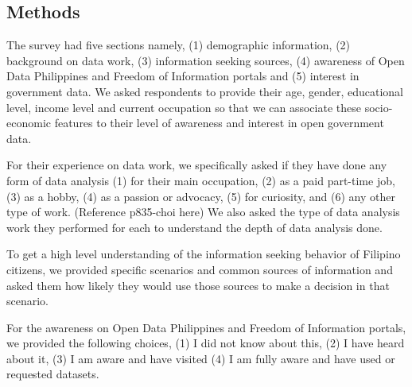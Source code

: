 \documentclass{sigchi}
\begin{document}

\subsection{Methods}
The survey had five sections namely, (1) demographic information, (2) background on data work, (3) information seeking sources, (4) awareness of Open Data Philippines and Freedom of Information portals and (5) interest in government data. We asked respondents to provide their age, gender, educational level, income level and current occupation so that we can associate these socio-economic features to their level of awareness and interest in open government data.

For their experience on data work, we specifically asked if they have done any form of data analysis (1) for their main occupation, (2) as a paid part-time job, (3) as a hobby, (4) as a passion or advocacy, (5) for curiosity, and (6) any other type of work. (Reference p835-choi here) We also asked the type of data analysis work they performed for each to understand the depth of data analysis done.

To get a high level understanding of the information seeking behavior of Filipino citizens, we provided specific scenarios and common sources of information and asked them how likely they would use those sources to make a decision in that scenario. 

For the awareness on Open Data Philippines and Freedom of Information portals, we provided the following choices, (1) I did not know about this, (2) I have heard about it, (3) I am aware and have visited (4) I am fully aware and have used or requested datasets. 
\end{document}
